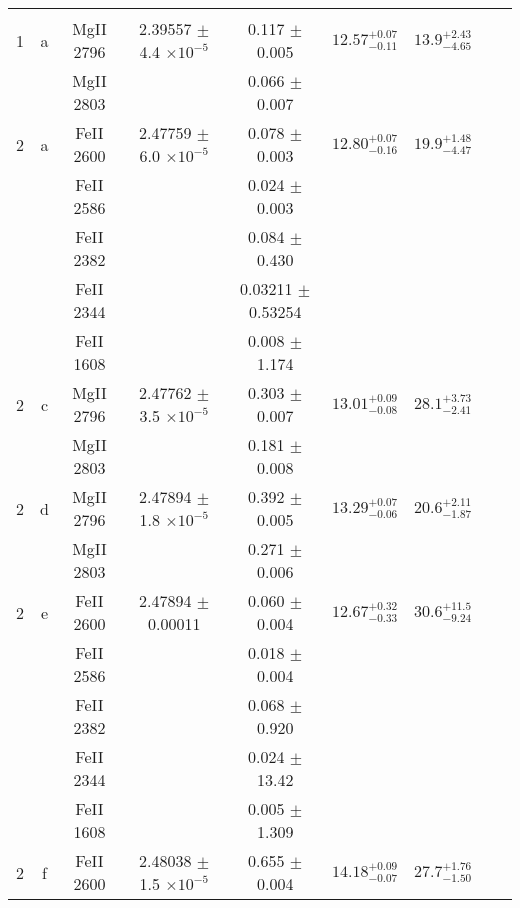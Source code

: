 \documentclass[12pt]{article}
\begin{document}
\begin{footnotesize}
\begin{longtable}{ c c c c c c c c c}
\hline                                                                                                                                                   
		&	   &                           &            & 	& 					&							  	& \\                                                                 
       1  & a  & MgII     2796  &  2.39557 $\pm$ 4.4 $\times 10^{-5}$   &  0.117 $\pm$ 0.005   & $12.57_{ - 0.11}^{ + 0.07}$  & $13.9_{ - 4.65}^{ + 2.43}$    & 	 & \\ 
  &   & MgII     2803  &  &  0.066 $\pm$ 0.007   &   &     & 	 & \\ 
       2  & a  & FeII     2600  &  2.47759 $\pm$ 6.0 $\times 10^{-5}$   &  0.078 $\pm$ 0.003   & $12.80_{ - 0.16}^{ + 0.07}$  & $19.9_{ - 4.47}^{ + 1.48}$    & 	 & \\ 
  &   & FeII     2586  &  &  0.024 $\pm$ 0.003   &   &     & 	 & \\ 
  &   & FeII     2382  &  &  0.084 $\pm$ 0.430   &   &     & 	 & \\ 
  &   & FeII     2344  &  &  0.03211 $\pm$ 0.53254   &   &     & 	 & \\ 
  &   & FeII     1608  &  &  0.008 $\pm$ 1.174   &   &     & 	 & \\ 
       2  & c  & MgII     2796  &  2.47762 $\pm$ 3.5 $\times 10^{-5}$   &  0.303 $\pm$ 0.007   & $13.01_{ - 0.08}^{ + 0.09}$  & $28.1_{ - 2.41}^{ + 3.73}$    & 	 & \\ 
  &   & MgII     2803  &  &  0.181 $\pm$ 0.008   &   &     & 	 & \\ 
       2  & d  & MgII     2796  &  2.47894 $\pm$ 1.8 $\times 10^{-5}$   &  0.392 $\pm$ 0.005   & $13.29_{ - 0.06}^{ + 0.07}$  & $20.6_{ - 1.87}^{ + 2.11}$    & 	 & \\ 
  &   & MgII     2803  &  &  0.271 $\pm$ 0.006   &   &     & 	 & \\ 
       2  & e  & FeII     2600  &  2.47894 $\pm$ 0.00011  &  0.060 $\pm$ 0.004   & $12.67_{ - 0.33}^{ + 0.32}$  & $30.6_{ - 9.24}^{ + 11.5}$    & 	 & \\ 
  &   & FeII     2586  &  &  0.018 $\pm$ 0.004   &   &     & 	 & \\ 
  &   & FeII     2382  &  &  0.068 $\pm$ 0.920   &   &     & 	 & \\ 
  &   & FeII     2344  &  &  0.024 $\pm$ 13.42   &   &     & 	 & \\ 
  &   & FeII     1608  &  &  0.005 $\pm$ 1.309   &   &     & 	 & \\ 
       2  & f  & FeII     2600  &  2.48038 $\pm$ 1.5 $\times 10^{-5}$   &  0.655 $\pm$ 0.004   & $14.18_{ - 0.07}^{ + 0.09}$  & $27.7_{ - 1.50}^{ + 1.76}$    & 	 & \\ 

\end{longtable}
\end{footnotesize}
\end{document}
